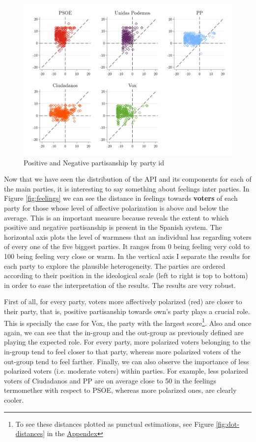 \documentclass[a4paper, svgnames]{article}
\begin{document}
\begin{figure}[H]
	\centering
	\includegraphics[width=\textwidth]{Figures/pos_neg_parties.png}
	\caption{Positive and Negative partisanship by party id}
	\label{fig:pos-neg-parties}
\end{figure}


Now that we have seen the distribution of the API and its components for each of the main parties, it is interesting to say something about feelings inter parties. In Figure \ref{fig:feelings} we can see the distance in feelings towards \textbf{voters} of each party for those whose level of affective polarization is above and below the average. This is an important measure because reveals the extent to which positive and negative partisanship is present in the Spanish system. The horizontal axis plots the level of warmness that an individual has regarding voters of every one of the five biggest parties. It ranges from 0 being feeling very cold to 100 being feeling very close or warm. In the vertical axis I separate the results for each party to explore the plausible heterogeneity. The parties are ordered according to their position in the ideological scale (left to right is top to bottom) in order to ease the interpretation of the results. The results are very robust.


First of all, for every party, voters more affectively polarized (red) are closer to their party, that is, positive partisanship towards own's party plays a crucial role. This is specially the case for Vox, the party with the largest score\footnote{To see these distances plotted as punctual estimations, see Figure \ref{fig:dot-distances} in the \hyperref[appendix]{Appendex}}. Also and once again, we can see that the in-group and the out-group as previously defined are playing the expected role. For every party, more polarized voters belonging to the in-group tend to feel closer to that party, whereas more polarized voters of the out-group tend to feel farther. Finally, we can also observe the importance of less polarized voters (i.e. moderate voters) within parties. For example, less polarized voters of Ciudadanos and PP are on average close to 50 in the feelings termomether with respect to PSOE, whereas more polarized ones, are clearly cooler.
\end{document}
